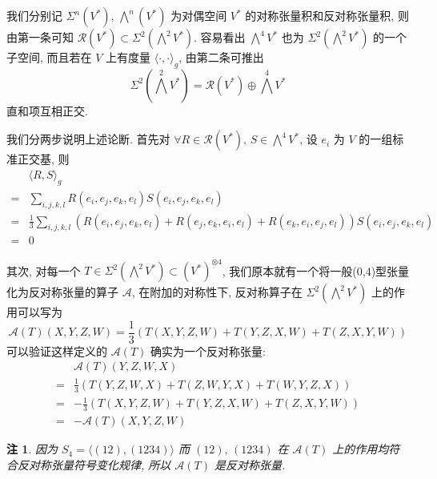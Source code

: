 \documentclass{book}
\newtheorem*{remark}{\indent 注}
\begin{document}
        我们分别记 $\Sigma^n(V^*),\,\bigwedge^n(V^*)$ 为对偶空间 $V^*$ 的对称张量积和反对称张量积, 则由第一条可知 $\mathcal{R}(V^*)\subset\Sigma^2(\bigwedge^2V^*)$.
        容易看出 $\bigwedge^4V^*$ 也为 $\Sigma^2(\bigwedge^2V^*)$ 的一个子空间, 而且若在 $V$ 上有度量 $\langle \cdot,\cdot\rangle_g$, 由第二条可推出
        \begin{equation*}
            \textstyle \Sigma^2(\bigwedge^2V^*) = \mathcal{R}(V^*)\oplus\bigwedge^4V^*
        \end{equation*}
        直和项互相正交.

        我们分两步说明上述论断. 首先对 $\forall R\in\mathcal{R}(V^*),\,S\in\bigwedge^4V^*$, 设 $e_i$ 为 $V$ 的一组标准正交基, 则
        \begin{align*}
            & \langle R,S\rangle_g \\
            = & \sum_{i,j,k,l}R(e_i,e_j,e_k,e_l)S(e_i,e_j,e_k,e_l) \\
            = & \frac{1}{3}\sum_{i,j,k,l}\left(R(e_i,e_j,e_k,e_l) + R(e_j,e_k,e_i,e_l) + R(e_k,e_i,e_j,e_l)\right)S(e_i,e_j,e_k,e_l) \\
            = & 0
        \end{align*}

        其次, 对每一个 $T\in\Sigma^2(\bigwedge^2V^*)\subset(V^*)^{\otimes4}$, 我们原本就有一个将一般(0,4)型张量化为反对称张量的算子 $\mathcal{A}$, 在附加的对称性下, 反对称算子在 $\Sigma^2(\bigwedge^2V^*)$ 上的作用可以写为
        \begin{equation*}
            \mathcal{A}(T)(X,Y,Z,W) = \frac{1}{3}\left(T(X,Y,Z,W) + T(Y,Z,X,W) + T(Z,X,Y,W)\right)
        \end{equation*}
        可以验证这样定义的 $\mathcal{A}(T)$ 确实为一个反对称张量:
        \begin{align*}
            & \mathcal{A}(T)(Y,Z,W,X) \\
            =& \frac{1}{3}\left(T(Y,Z,W,X) + T(Z,W,Y,X) + T(W,Y,Z,X)\right) \\
            =& -\frac{1}{3}\left(T(X,Y,Z,W) + T(Y,Z,X,W) + T(Z,X,Y,W)\right) \\
            =& -\mathcal{A}(T)(X,Y,Z,W)
        \end{align*}
        \begin{remark}
            因为 $S_4 = \langle(12),(1234)\rangle$ 而 $(12),\,(1234)$ 在 $\mathcal{A}(T)$ 上的作用均符合反对称张量符号变化规律, 所以 $\mathcal{A}(T)$ 是反对称张量.
        \end{remark}
\end{document}

